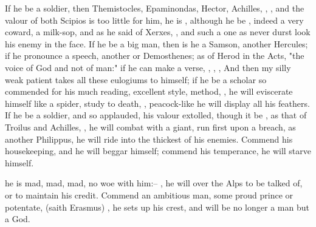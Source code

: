 If he be a soldier, then Themistocles, Epaminondas, Hector, Achilles, , \etc{}, and the valour of both Scipios is
too little for him, he is , although he be , indeed a
very coward, a milk-sop, and as he said of Xerxes,
, and such a one as never durst look his
enemy in the face. If he be a big man, then is he a Samson, another Hercules;
if he pronounce a speech, another \Tully{} or Demosthenes; as of Herod in the
Acts, "the voice of God and not of man:" if he can make a verse, \Homer{}, \Virgil{},
\etc{}, And then my silly weak patient takes all these eulogiums to himself; if
he be a scholar so commended for his much reading, excellent style, method,
\etc{}, he will eviscerate himself like a spider, study to death, , peacock-like he will display all his feathers.
If he be a soldier, and so applauded, his valour extolled, though it be
, as that of Troilus and Achilles, , he
will combat with a giant, run first upon a breach, as another
Philippus, he will ride into the thickest of his enemies.
Commend his housekeeping, and he will beggar himself; commend his temperance,
he will starve himself.

%
he is mad, mad, mad, no woe with him:-- , he will
over the Alps to be talked of, or to maintain his credit.
Commend an ambitious man, some proud prince or potentate,  (saith Erasmus) , he sets up his crest, and will be no longer a man but
a God.



